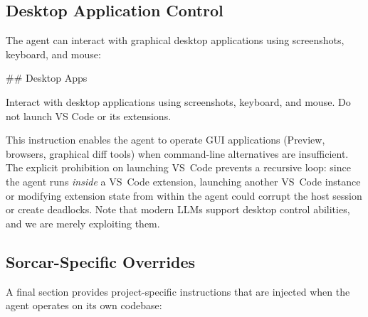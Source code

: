\documentclass{article}
\begin{document}
\subsection{Desktop Application Control}

The agent can interact with graphical desktop applications using screenshots, keyboard, and mouse:

\begin{prompt}
## Desktop Apps

Interact with desktop applications using screenshots, keyboard, and mouse. Do not launch VS Code or its extensions.
\end{prompt}

\noindent This instruction enables the agent to operate GUI applications (Preview, browsers, graphical diff tools) when command-line alternatives are insufficient.  The explicit prohibition on launching VS~Code prevents a recursive loop: since the agent runs \emph{inside} a VS~Code extension, launching another VS~Code instance or modifying extension state from within the agent could corrupt the host session or create deadlocks.  Note that modern LLMs support desktop control abilities, and we are merely exploiting them.

\subsection{Sorcar-Specific Overrides}

A final section provides project-specific instructions that are injected when the agent operates on its own codebase:
\end{document}
